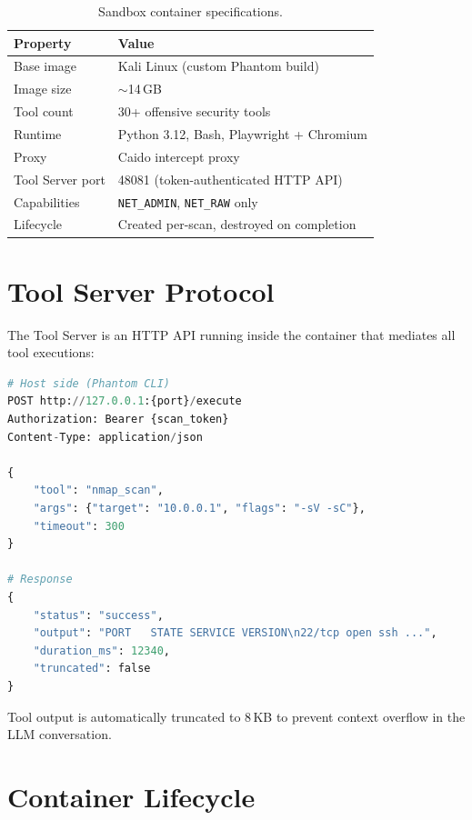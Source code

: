 \documentclass[12pt,a4paper,twoside]{report}
\begin{document}
\begin{table}[H]
\centering
\caption{Sandbox container specifications.}
\label{tab:sandbox}
\begin{tabularx}{\textwidth}{lX}
\toprule
\textbf{Property} & \textbf{Value} \\
\midrule
Base image         & Kali Linux (custom Phantom build) \\
Image size         & $\sim$14\,GB \\
Tool count         & 30+ offensive security tools \\
Runtime            & Python 3.12, Bash, Playwright + Chromium \\
Proxy              & Caido intercept proxy \\
Tool Server port   & 48081 (token-authenticated HTTP API) \\
Capabilities       & \texttt{NET\_ADMIN}, \texttt{NET\_RAW} only \\
Lifecycle          & Created per-scan, destroyed on completion \\
\bottomrule
\end{tabularx}
\end{table}

\section{Tool Server Protocol}

The Tool Server is an HTTP API running inside the container that mediates all tool executions:

\begin{lstlisting}[language=Python, caption={Simplified tool server request flow.}]
# Host side (Phantom CLI)
POST http://127.0.0.1:{port}/execute
Authorization: Bearer {scan_token}
Content-Type: application/json

{
    "tool": "nmap_scan",
    "args": {"target": "10.0.0.1", "flags": "-sV -sC"},
    "timeout": 300
}

# Response
{
    "status": "success",
    "output": "PORT   STATE SERVICE VERSION\n22/tcp open ssh ...",
    "duration_ms": 12340,
    "truncated": false
}
\end{lstlisting}

Tool output is automatically truncated to 8\,KB to prevent context overflow in the LLM conversation.

\section{Container Lifecycle}
\end{document}
